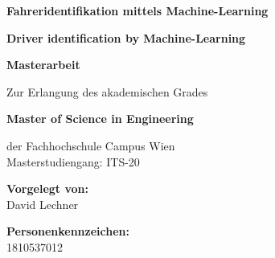 \begin{center}

\vspace{4.9cm}

\hspace*{-1.0cm} {\LARGE \textbf{Fahreridentifikation mittels Machine-Learning\\}}
\vspace{0.2cm}

\vspace{1cm}

\hspace*{-1.0cm} {\LARGE \textbf{Driver identification by Machine-Learning\\}}
\vspace{0.2cm}

\vspace{2.7cm}

\hspace*{-1.0cm} {\LARGE \textbf{Masterarbeit\\}}

\vspace{0.65cm}

\hspace*{-1.0cm} Zur Erlangung des akademischen Grades \\

\vspace{0.65cm}

\hspace*{-1.0cm} \textbf{Master of Science in Engineering\\}

\vspace{0.65cm}

\hspace*{-1.0cm} der Fachhochschule Campus Wien \\
\vspace{0.2cm}
\hspace*{-1.0cm} Masterstudiengang: ITS-20 \\

\vspace{1.6cm}

\hspace*{-1.0cm} \textbf{Vorgelegt von:} \\
\vspace{0.2cm}
\hspace*{-1.0cm} David Lechner \\

\vspace{0.7cm}

\hspace*{-1.0cm} \textbf{Personenkennzeichen:}\\
\vspace{0.2cm}
\hspace*{-1.0cm} 1810537012 \\


\end{center}
